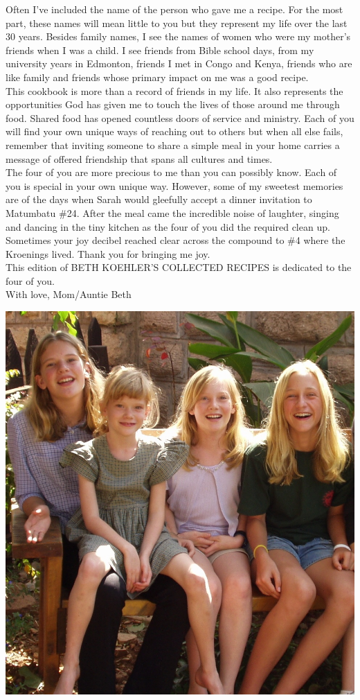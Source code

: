 \documentclass[12pt]{memoir} %
\begin{document}
Often I've included the name of the person who gave me a recipe. For the most part, these names will mean little to you but they represent my life over the last 30 years. Besides family names, I see the names of women who were my mother's friends when I was a child. I see friends from Bible school days, from my university years in Edmonton, friends I met in Congo and Kenya, friends who are like family and friends whose primary impact on me was a good recipe. \\[10pt]
This cookbook is more than a record of friends in my life. It also represents the opportunities God has given me to touch the lives of those around me through food. Shared food has opened countless doors of service and ministry. Each of you will find your own unique ways of reaching out to others but when all else fails, remember that inviting someone to share a simple meal in your home carries a message of offered friendship that spans all cultures and times. \\[10pt]
The four of you are more precious to me than you can possibly know. Each of you is special in your own unique way. However, some of my sweetest memories are of the days when Sarah would gleefully accept a dinner invitation to Matumbatu \#24. After the meal came the incredible noise of laughter, singing and dancing in the tiny kitchen as the four of you did the required clean up. Sometimes your joy decibel reached clear across the compound to \#4 where the Kroenings lived. Thank you for bringing me joy. \\[10pt]
This edition of BETH KOEHLER'S COLLECTED RECIPES is dedicated to the four of you. \\[10pt]
\hspace{0.5\linewidth}With love, Mom/Auntie Beth

\centerline{\includegraphics[width=0.75\linewidth]{Girls.jpg}}
\end{document}
